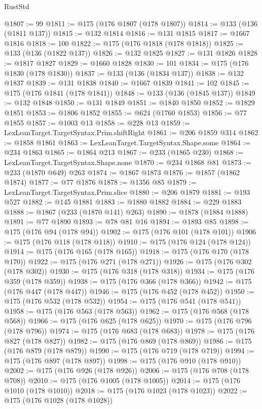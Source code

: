 \begin{lexlean}{RustStd}
\begin{coremodule}
@1807 := 99
@1811 := @175 (@176 @1807 (@178 @1807))
@1814 := @133 (@136 (@1811 @137))
@1815 := @132 @1814
@1816 := @131 @1815
@1817 := @1667 @1816
@1818 := 100
@1822 := @175 (@176 @1818 (@178 @1818))
@1825 := @133 (@136 (@1822 @137))
@1826 := @132 @1825
@1827 := @131 @1826
@1828 := @1817 @1827
@1829 := @1660 @1828
@1830 := 101
@1834 := @175 (@176 @1830 (@178 @1830))
@1837 := @133 (@136 (@1834 @137))
@1838 := @132 @1837
@1839 := @131 @1838
@1840 := @1667 @1839
@1841 := 102
@1845 := @175 (@176 @1841 (@178 @1841))
@1848 := @133 (@136 (@1845 @137))
@1849 := @132 @1848
@1850 := @131 @1849
@1851 := @1840 @1850
@1852 := @1829 @1851
@1853 := @1806 @1852
@1855 := @624 (@1760 @1853)
@1856 := @77 @1855
@1857 := @1003 @13
@1858 := @228 @13
@1859 := LexLeanTarget.TargetSyntax.Prim.shiftRight
@1861 := @206 @1859 @314
@1862 := @1858 @1861
@1863 := LexLeanTarget.TargetSyntax.Shape.some
@1864 := @234 @1863
@1865 := @1864 @213
@1867 := @233 (@1865 @230)
@1868 := LexLeanTarget.TargetSyntax.Shape.none
@1870 := @234 @1868 @81
@1873 := @233 (@1870 @649) @263
@1874 := @1867 @1873
@1876 := @1857 (@1862 @1874)
@1877 := @77 @1876
@1878 := @1356 @85
@1879 := LexLeanTarget.TargetSyntax.Prim.slice
@1880 := @206 @1879
@1881 := @193 @527
@1882 := @145 @1881
@1883 := @1880 @1882
@1884 := @229 @1883
@1888 := @1867 (@233 (@1870 @141) @263)
@1890 := @1878 (@1884 @1888)
@1891 := @77 @1890
@1893 := @78 @81 @16
@1894 := @1893 @85
@1898 := @175 (@176 @94 (@178 @94))
@1902 := @175 (@176 @101 (@178 @101))
@1906 := @175 (@176 @118 (@178 @118))
@1910 := @175 (@176 @124 (@178 @124))
@1914 := @175 (@176 @165 (@178 @165))
@1918 := @175 (@176 @170 (@178 @170))
@1922 := @175 (@176 @271 (@178 @271))
@1926 := @175 (@176 @302 (@178 @302))
@1930 := @175 (@176 @318 (@178 @318))
@1934 := @175 (@176 @359 (@178 @359))
@1938 := @175 (@176 @366 (@178 @366))
@1942 := @175 (@176 @447 (@178 @447))
@1946 := @175 (@176 @452 (@178 @452))
@1950 := @175 (@176 @532 (@178 @532))
@1954 := @175 (@176 @541 (@178 @541))
@1958 := @175 (@176 @563 (@178 @563))
@1962 := @175 (@176 @568 (@178 @568))
@1966 := @175 (@176 @625 (@178 @625))
@1970 := @175 (@176 @796 (@178 @796))
@1974 := @175 (@176 @683 (@178 @683))
@1978 := @175 (@176 @827 (@178 @827))
@1982 := @175 (@176 @869 (@178 @869))
@1986 := @175 (@176 @879 (@178 @879))
@1990 := @175 (@176 @719 (@178 @719))
@1994 := @175 (@176 @897 (@178 @897))
@1998 := @175 (@176 @910 (@178 @910))
@2002 := @175 (@176 @926 (@178 @926))
@2006 := @175 (@176 @708 (@178 @708))
@2010 := @175 (@176 @1005 (@178 @1005))
@2014 := @175 (@176 @1010 (@178 @1010))
@2018 := @175 (@176 @1023 (@178 @1023))
@2022 := @175 (@176 @1028 (@178 @1028))

\end{coremodule}
\end{lexlean}
